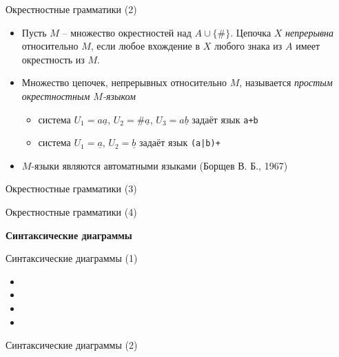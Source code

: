 \documentclass{beamer}
\begin{document}
\begin{frame}{Окрестностные грамматики (2)}
\begin{small}
\begin{itemize}
	\item Пусть $M$ -- множество окрестностей над $A \cup \{ \# \}$. Цепочка $X$ \textit{непрерывна} относительно $M$, если любое вхождение в $X$ любого знака из $A$ имеет окрестность из $M$.
	\item Множество цепочек, непрерывных относительно $M$, называется \textit{простым окрестностным $M$-языком}
		\begin{itemize}
			\item система $U_1 = a\underline{a}$, $U_2 = \#\underline{a}$, $U_3 = a\underline{b}$ задаёт язык \texttt{a+b}
			\item система $U_1 = \underline{a}$, $U_2 = \underline{b}$ задаёт язык \texttt{(a|b)+}
		\end{itemize}
	\item $M$-языки являются автоматными языками (Борщев В. Б., 1967)
\end{itemize}
\end{small}
\end{frame}

\begin{frame}{Окрестностные грамматики (3)}
\end{frame}

\begin{frame}{Окрестностные грамматики (4)}
\end{frame}



\begin{frame}{}
\begin{center}
	\textbf{Синтаксические диаграммы}
\end{center}
\end{frame}

\begin{frame}{Синтаксические диаграммы (1)}
\begin{itemize}
	\item
	\item
	\item
	\item
\end{itemize}
\end{frame}

\begin{frame}{Синтаксические диаграммы (2)}
\end{frame}
\end{document}
